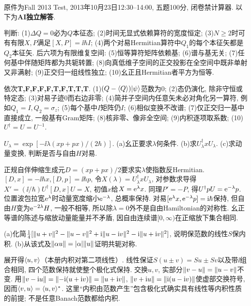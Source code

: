 原件为Fall 2013 Test, 2013年10月23日12:30--14:00, 五题100分, 闭卷禁计算器. 以下为\textbf{AI独立解答}.
\begin{exercise}
判断: (1)$\Delta Q=0$必为$Q$本征态; (2)时间无显式依赖算符的宽度恒定; (3)$N\geq2$时可有有限$X,P$满足$[X,P]=\ii\hbar I$; (4)两个对易Hermitian算符中$Q_1$的每个本征矢都是$Q_2$本征矢. 后六项为有限维复空间: (5)恒等算符矩阵依赖基; (6)谱与基无关; (7)任何基中伴随矩阵都为共轭转置; (8)向真低维子空间的正交投影在全空间中既非单射又非满射; (9)正交归一组线性独立; (10)幺正且Hermitian者平方为恒等.
\end{exercise}
\begin{solution}
依次\textbf{T,F,F,F,F,T,F,T,T,T}. (1)$(Q-\langle Q\rangle)\lvert \psi\rangle$范数为0; (2)态仍演化, 除非守恒或特定态; (3)对易子迹0而右边非零; (4)简并子空间内任意矢未必对角化另一算符, 例如$Q_1=I,Q_2=\sigma_z$; (5)每个基中$I$矩阵仍$I$; (6)相似变换不改谱; (7)仅正交归一基中直接成立, 一般基有Gram矩阵; (8)核非零、像非全空间; (9)内积逐项取系数; (10)$U^\dagger=U=U^{-1}$.
\end{solution}
\begin{exercise}
$U_\lambda=\exp[-\ii\lambda(xp+px)/(2\hbar)]$. (a)幺正要求$\lambda$何条件. (b)求$U_\lambda^\dagger xU_\lambda$. (c)求动量变换, 判断是否与自由$H$对易.
\end{exercise}
\begin{solution}
正规自伴伸缩生成元$D=(xp+px)/2$要求实$\lambda$使指数反Hermitian. $[D,x]=-\ii\hbar x$,$[D,p]=\ii\hbar p$, 令$X(\lambda)=U_\lambda^\dagger xU_\lambda$, 对参数求导得$X\prime=(\ii/\hbar)U^\dagger[D,x]U=X$, 初值$x$给$X=\mathrm e^\lambda x$. 同理$P\prime=-P$, 得$U^\dagger pU=\mathrm e^{-\lambda}p$. 位置波包拉宽$\mathrm e^\lambda$时动量宽度缩小$\mathrm e^{-\lambda}$, 总概率保持. 对易$[\mathrm e^\lambda x,\mathrm e^{-\lambda}p]=\mathrm i\hbar$保持, 但自由$H$变为$\mathrm e^{-2\lambda}H$, 一般不相等, 所以除$\lambda=0$外不是自由Hamiltonian的对称性. 幺正等谱的陈述与缩放动量能量并不矛盾, 因自由连续谱$[0,\infty)$在正缩放下集合相同.
\end{solution}
\begin{exercise}
(a)化简$\tfrac14[\lVert u+v\rVert^2-\lVert u-v\rVert^2+\mathrm i\lVert u-\mathrm i v\rVert^2-\mathrm i\lVert u+\mathrm i v\rVert^2]$, 说明保范数的线性$S$保内积. (b)从该式及$\lVert \alpha u\rVert=|\alpha|\lVert u\rVert$证明共轭对称.
\end{exercise}
\begin{solution}
展开得$\langle u,v\rangle$（本册内积对第二项线性）. 线性保证$S(u\pm v)=Su\pm Sv$以及带$\ii$组合相同, 四个范数保持就使整个极化式保持. 交换$u,v$, 实部分$\lVert v-u\rVert=\lVert u-v\rVert$不变. 用$\lVert v-\mathrm i u\rVert=\lVert -\mathrm i(u+\mathrm i v)\rVert=\lVert u+\mathrm i v\rVert$, $\lVert v+\mathrm i u\rVert=\lVert \mathrm i(u-\mathrm i v)\rVert$使虚部交换符号, 因而$\langle v,u\rangle=\langle u,v\rangle^*$. 这里“内积由范数产生”包含极化式确实具有线性等内积性质的前提; 不是任意Banach范数都给内积.
\end{solution}
